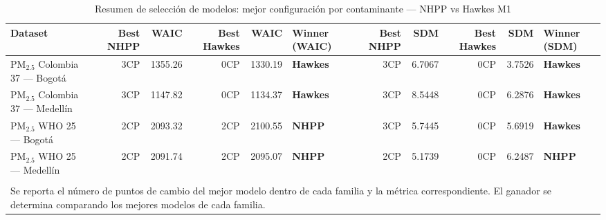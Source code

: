 \begin{table}[htbp]
\centering
\caption{Resumen de selecci\'{o}n de modelos: mejor configuraci\'{o}n por contaminante --- NHPP vs Hawkes M1}
\label{tab:comp_resumen}
\begin{tabular}{lrrrrlrrrrl}
\toprule
Dataset & Best NHPP & WAIC & Best Hawkes & WAIC & Winner (WAIC) & Best NHPP & SDM & Best Hawkes & SDM & Winner (SDM) \\
\midrule
PM$_{2.5}$ Colombia 37 --- Bogot\'{a} & 3CP & 1355.26 & 0CP & 1330.19 & \textbf{Hawkes} & 3CP & 6.7067 & 0CP & 3.7526 & \textbf{Hawkes} \\
PM$_{2.5}$ Colombia 37 --- Medell\'{i}n & 3CP & 1147.82 & 0CP & 1134.37 & \textbf{Hawkes} & 3CP & 8.5448 & 0CP & 6.2876 & \textbf{Hawkes} \\
PM$_{2.5}$ WHO 25 --- Bogot\'{a} & 2CP & 2093.32 & 2CP & 2100.55 & \textbf{NHPP} & 3CP & 5.7445 & 0CP & 5.6919 & \textbf{Hawkes} \\
PM$_{2.5}$ WHO 25 --- Medell\'{i}n & 2CP & 2091.74 & 2CP & 2095.07 & \textbf{NHPP} & 2CP & 5.1739 & 0CP & 6.2487 & \textbf{NHPP} \\
\bottomrule
\\[-0.5em]
\multicolumn{11}{l}{\footnotesize Se reporta el n\'{u}mero de puntos de cambio del mejor modelo dentro de cada familia y la m\'{e}trica correspondiente. El ganador se determina comparando los mejores modelos de cada familia.}
\end{tabular}
\end{table}
